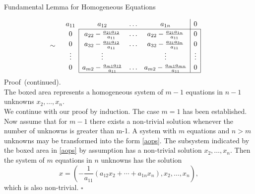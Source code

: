 \documentclass[smaller,hyperref={CJKbookmarks=true}]{beamer}
\begin{document}
\begin{frame}{Fundamental Lemma for Homogeneous Equations}
\begin{spacing}{1.05}
\begin{equation}
\begin{split}
    \sim~~~
    \renewcommand{\arraystretch}{1.2}
    &\begin{array}{cccc|c}
      a_{11} & a_{12}                                                   & \ldots & a_{1n} & 0 \\ \cline{2-5}
      0      & \multicolumn{1}{|c}{a_{22}-\frac{a_{21} a_{12}}{a_{11}}} & \ldots & a_{22}-\frac{a_{21} a_{1n}}{a_{11}} & \multicolumn{1}{c|}{0} \\
      0      & \multicolumn{1}{|c}{a_{32}-\frac{a_{31} a_{12}}{a_{11}}} & \ldots & a_{32}-\frac{a_{31} a_{3n}}{a_{11}} & \multicolumn{1}{c|}{0} \\
      \vdots & \multicolumn{1}{|c}{\vdots} &  & \vdots & \multicolumn{1}{c|}{\vdots} \\
      0      & \multicolumn{1}{|c}{a_{m2}-\frac{a_{m1} a_{12}}{a_{11}}} & \ldots & a_{m2}-\frac{a_{m1} a_{mn}}{a_{11}} & \multicolumn{1}{c|}{0} \\ \cline{2-5}
    \end{array}
  \end{split}
\end{equation}
\newpage
\alert{Proof~(continued).}\\
The boxed area represents a homogeneous system of $m-1$ equations in $n-1$ unknowns $x_2,\ldots,x_n$.\\
We continue with our proof by induction. The case $m=1$ has been
established. Now assume that for $m-1$ there exists a non-trivial solution
whenever the number of unknowns is greater than m-1. A system with
$m$ equations and $n>m$ unknowns may be transformed into the form \eqref{aops}. The subsystem indicated by the boxed area in \eqref{aops} by assumption has a non-trivial solution $x_2,\ldots,x_n$. Then the system of $m$ equations in $n$ unknowns has the solution
\[x=\left(-\frac{1}{a_{11}}\left(a_{12}x_2+\cdots+a_{1n}x_n\right),x_2,\ldots,x_n\right),\]
which is also non-trivial.\qquad\qquad\qquad\qquad
\qquad\qquad\qquad\qquad\qquad\qquad\qquad
\quad
$\square$
\end{spacing}
\end{frame}
\end{document}
